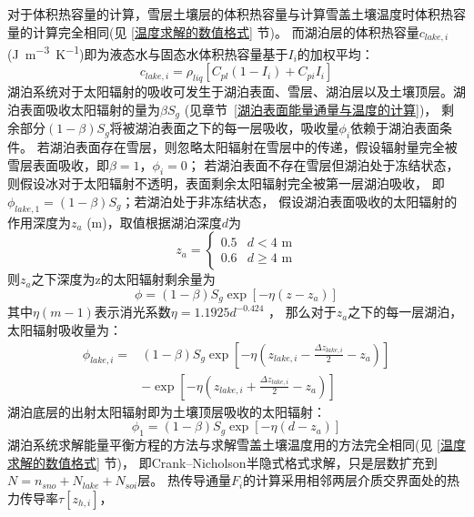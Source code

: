 对于体积热容量的计算，雪层土壤层的体积热容量与计算雪盖土壤温度时体积热容量的计算完全相同(见 \ref{温度求解的数值格式} 节)。
而湖泊层的体积热容量$c_{lake,i}$ (\unit{J.m^{-3}.K^{-1}})即为液态水与固态水体积热容量基于$I_i$的加权平均：
\begin{equation}
c_{lake, i}=\rho_{liq}\left[C_{p l}\left(1-I_{i}\right)+C_{p i} I_{i}\right]
\end{equation}
湖泊系统对于太阳辐射的吸收可发生于湖泊表面、雪层、湖泊层以及土壤顶层。湖泊表面吸收太阳辐射的量为$\beta S_g$ (见章节~\ref{湖泊表面能量通量与温度的计算})，
剩余部分$\left(1-\beta\right)S_g$将被湖泊表面之下的每一层吸收，吸收量$\phi_i$依赖于湖泊表面条件。
若湖泊表面存在雪层，则忽略太阳辐射在雪层中的传递，假设辐射量完全被雪层表面吸收，即$\beta=1$，$\phi_i=0$；
若湖泊表面不存在雪层但湖泊处于冻结状态，则假设冰对于太阳辐射不透明，表面剩余太阳辐射完全被第一层湖泊吸收，
即$\phi_{lake,1}=\left(1-\beta\right)S_g$；若湖泊处于非冻结状态，
假设湖泊表面吸收的太阳辐射的作用深度为$z_a$ (m)，取值根据湖泊深度$d$为
\begin{equation}
z_{a}=\left\{\begin{array}{ll}0.5 & d<4 \text{ m} \\ 0.6 & d \geq 4 \text{ m}\end{array}\right.
\end{equation}
则$z_a$之下深度为z的太阳辐射剩余量为
\begin{equation}
\phi=(1-\beta) S_{g} \exp \left[-\eta\left(z-z_{a}\right)\right]
\end{equation}
其中$\eta(m-1)$表示消光系数$\eta=1.1925d^{-0.424}$ \citep{subin2012improved}，
那么对于$z_a$之下的每一层湖泊，太阳辐射吸收量为：
\begin{equation}
\begin{split}
    \phi_{lake, i}= & (1-\beta) S_{g} \exp \left[-\eta\left(z_{lake, i}-\frac{\Delta z_{lake, i}}{2}-z_{a}\right)\right] \\
     & -\exp \left[-\eta\left(z_{lake, i}+\frac{\Delta z_{lake, i}}{2}-z_{a}\right)\right]
\end{split}
\end{equation}
湖泊底层的出射太阳辐射即为土壤顶层吸收的太阳辐射：
\begin{equation}
\phi_{1}=(1-\beta) S_{g} \exp \left[-\eta\left(d-z_{a}\right)\right]
\end{equation}
湖泊系统求解能量平衡方程的方法与求解雪盖土壤温度用的方法完全相同(见 \ref{温度求解的数值格式} 节)，
即Crank--Nicholson半隐式格式求解，只是层数扩充到$N=n_{sno}+N_{lake}+N_{soi}$层。
热传导通量$F_i$的计算采用相邻两层介质交界面处的热力传导率$\tau\left[z_{h,i}\right]$，
